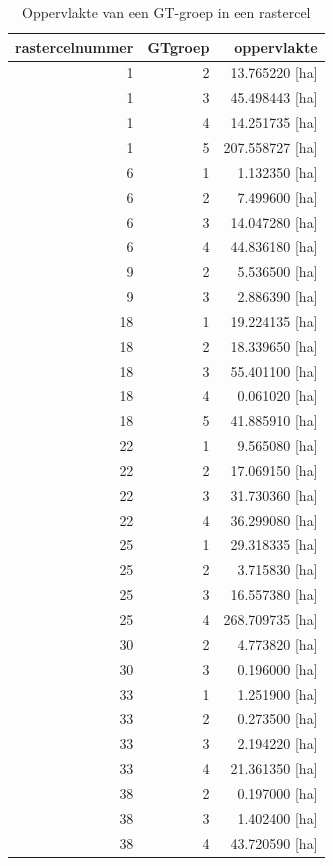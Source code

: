 \documentclass[11pt,]{book}
\begin{document}
\begin{table}

\caption{\label{tab:oppGTpercel}Oppervlakte van een GT-groep in een rastercel}
\centering
\begin{tabular}[t]{r|r|r}
\hline
rastercelnummer & GTgroep & oppervlakte\\
\hline
1 & 2 & 13.765220 [ha]\\
\hline
1 & 3 & 45.498443 [ha]\\
\hline
1 & 4 & 14.251735 [ha]\\
\hline
1 & 5 & 207.558727 [ha]\\
\hline
6 & 1 & 1.132350 [ha]\\
\hline
6 & 2 & 7.499600 [ha]\\
\hline
6 & 3 & 14.047280 [ha]\\
\hline
6 & 4 & 44.836180 [ha]\\
\hline
9 & 2 & 5.536500 [ha]\\
\hline
9 & 3 & 2.886390 [ha]\\
\hline
18 & 1 & 19.224135 [ha]\\
\hline
18 & 2 & 18.339650 [ha]\\
\hline
18 & 3 & 55.401100 [ha]\\
\hline
18 & 4 & 0.061020 [ha]\\
\hline
18 & 5 & 41.885910 [ha]\\
\hline
22 & 1 & 9.565080 [ha]\\
\hline
22 & 2 & 17.069150 [ha]\\
\hline
22 & 3 & 31.730360 [ha]\\
\hline
22 & 4 & 36.299080 [ha]\\
\hline
25 & 1 & 29.318335 [ha]\\
\hline
25 & 2 & 3.715830 [ha]\\
\hline
25 & 3 & 16.557380 [ha]\\
\hline
25 & 4 & 268.709735 [ha]\\
\hline
30 & 2 & 4.773820 [ha]\\
\hline
30 & 3 & 0.196000 [ha]\\
\hline
33 & 1 & 1.251900 [ha]\\
\hline
33 & 2 & 0.273500 [ha]\\
\hline
33 & 3 & 2.194220 [ha]\\
\hline
33 & 4 & 21.361350 [ha]\\
\hline
38 & 2 & 0.197000 [ha]\\
\hline
38 & 3 & 1.402400 [ha]\\
\hline
38 & 4 & 43.720590 [ha]\\

\end{tabular}
\end{table}
\end{document}
